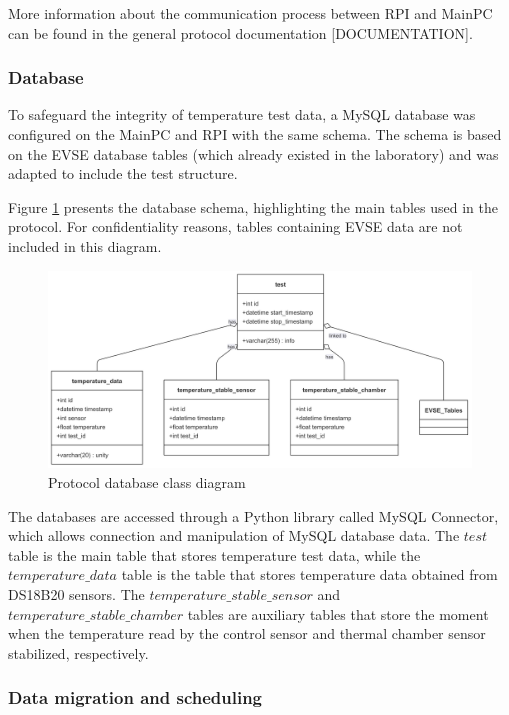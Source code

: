 More information about the communication process between RPI and MainPC can be found in the general protocol documentation [DOCUMENTATION].

\subsubsection{Database}

To safeguard the integrity of temperature test data, a MySQL database was configured on the MainPC and RPI with the same schema. 
The schema is based on the EVSE database tables (which already existed in the laboratory) and was adapted to include the test structure. 

Figure \ref{fig:class_diagram} presents the database schema, highlighting the main tables used in the protocol. For confidentiality reasons, tables containing EVSE data are not included in this diagram.

\begin{figure}[H]
    \centering
    \includegraphics[width=\textwidth]{figures/class_diagram.png}
    \caption{Protocol database class diagram}
    \label{fig:class_diagram}
\end{figure}


The databases are accessed through a Python library called MySQL Connector, which allows connection and manipulation of MySQL database data. The $test$ table is the main table that stores temperature test data, while the $\mathit{temperature\_data}$ table is the table that stores temperature data obtained from DS18B20 sensors. The $\mathit{temperature\_stable\_sensor}$ and $\mathit{temperature\_stable\_chamber}$ tables are auxiliary tables that store the moment when the temperature read by the control sensor and thermal chamber sensor stabilized, respectively.

\subsubsection{Data migration and scheduling}

